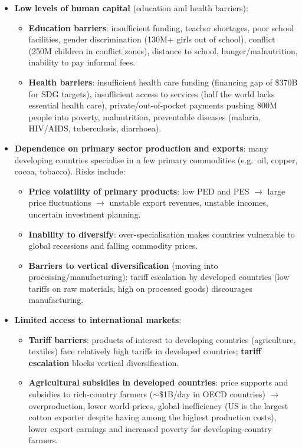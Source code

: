 \begin{itemize}
\begin{itemize}
  \end{itemize}
  \item \textbf{Low levels of human capital} (education and health barriers):
  \begin{itemize}
    \item \textbf{Education barriers}: insufficient funding, teacher shortages, poor school facilities, gender discrimination (130M+ girls out of school), conflict (250M children in conflict zones), distance to school, hunger/malnutrition, inability to pay informal fees.
    \item \textbf{Health barriers}: insufficient health care funding (financing gap of \$370B for SDG targets), insufficient access to services (half the world lacks essential health care), private/out-of-pocket payments pushing 800M people into poverty, malnutrition, preventable diseases (malaria, HIV/AIDS, tuberculosis, diarrhoea).
  \end{itemize}
  \item \textbf{Dependence on primary sector production and exports}: many developing countries specialise in a few primary commodities (e.g.\ oil, copper, cocoa, tobacco). Risks include:
  \begin{itemize}
    \item \textbf{Price volatility of primary products}: low PED and PES $\to$ large price fluctuations $\to$ unstable export revenues, unstable incomes, uncertain investment planning.
    \item \textbf{Inability to diversify}: over-specialisation makes countries vulnerable to global recessions and falling commodity prices.
    \item \textbf{Barriers to vertical diversification} (moving into processing/manufacturing): tariff escalation by developed countries (low tariffs on raw materials, high on processed goods) discourages manufacturing.
  \end{itemize}
  \item \textbf{Limited access to international markets}:
  \begin{itemize}
    \item \textbf{Tariff barriers}: products of interest to developing countries (agriculture, textiles) face relatively high tariffs in developed countries; \textbf{tariff escalation} blocks vertical diversification.
    \item \textbf{Agricultural subsidies in developed countries}: price supports and subsidies to rich-country farmers ($\sim$\$1B/day in OECD countries) $\to$ overproduction, lower world prices, global inefficiency (US is the largest cotton exporter despite having among the highest production costs), lower export earnings and increased poverty for developing-country farmers.

\end{itemize}
\end{itemize}

